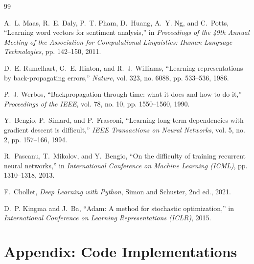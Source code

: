 \documentclass[11pt,a4paper]{article}
\begin{document}
\begin{thebibliography}{99}

A.~L. Maas, R.~E. Daly, P.~T. Pham, D.~Huang, A.~Y. Ng, and C.~Potts,
\newblock ``Learning word vectors for sentiment analysis,''
\newblock in \emph{Proceedings of the 49th Annual Meeting of the Association for Computational Linguistics: Human Language Technologies}, pp. 142--150, 2011.

D.~E. Rumelhart, G.~E. Hinton, and R.~J. Williams,
\newblock ``Learning representations by back-propagating errors,''
\newblock \emph{Nature}, vol. 323, no. 6088, pp. 533--536, 1986.

P.~J. Werbos,
\newblock ``Backpropagation through time: what it does and how to do it,''
\newblock \emph{Proceedings of the IEEE}, vol. 78, no. 10, pp. 1550--1560, 1990.

Y.~Bengio, P.~Simard, and P.~Frasconi,
\newblock ``Learning long-term dependencies with gradient descent is difficult,''
\newblock \emph{IEEE Transactions on Neural Networks}, vol. 5, no. 2, pp. 157--166, 1994.

R.~Pascanu, T.~Mikolov, and Y.~Bengio,
\newblock ``On the difficulty of training recurrent neural networks,''
\newblock in \emph{International Conference on Machine Learning (ICML)}, pp. 1310--1318, 2013.

F.~Chollet,
\newblock \emph{Deep Learning with Python},
\newblock Simon and Schuster, 2nd ed., 2021.

D.~P. Kingma and J.~Ba,
\newblock ``Adam: A method for stochastic optimization,''
\newblock in \emph{International Conference on Learning Representations (ICLR)}, 2015.

\end{thebibliography}

\newpage
\appendix
\section{Appendix: Code Implementations}
\label{sec:appendix}
\end{document}
